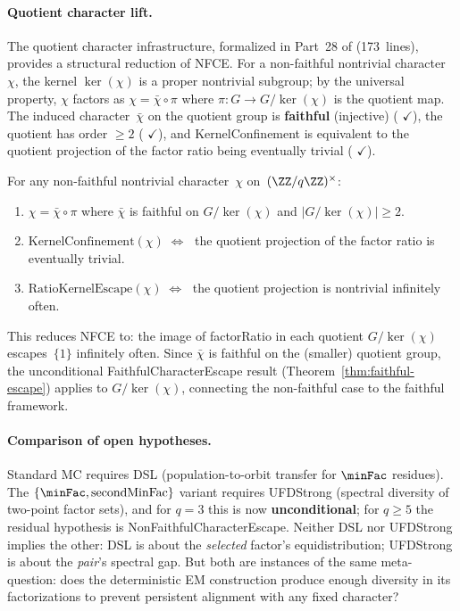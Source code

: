\paragraph{Quotient character lift.}
The quotient character infrastructure, formalized in Part~28 of
 (173~lines),
provides a structural reduction of NFCE\@.
For a non-faithful nontrivial character~$\chi$, the kernel
$\ker(\chi)$ is a proper nontrivial subgroup; by the universal
property, $\chi$ factors as
$\chi = \bar\chi \circ \pi$
where $\pi \colon G \to G/\ker(\chi)$ is the quotient map.
The induced character~$\bar\chi$ on the quotient group is
\textbf{faithful} (injective)
(
{\color{leanink}$\checkmark$}),
the quotient has order $\geq 2$
(
{\color{leanink}$\checkmark$}),
and KernelConfinement is equivalent to the quotient projection
of the factor ratio being eventually trivial
(
{\color{leanink}$\checkmark$}).
\begin{theorem}
\label{thm:quotient-lift}
For any non-faithful nontrivial character~$\chi$ on~$(\ZZ/q\ZZ)^\times$:
\begin{enumerate}[nosep]
\item $\chi = \bar\chi \circ \pi$ where $\bar\chi$ is faithful
  on $G/\ker(\chi)$ and $|G/\ker(\chi)| \geq 2$.
\item $\mathrm{KernelConfinement}(\chi) \;\Longleftrightarrow\;$
  the quotient projection of the factor ratio is eventually trivial.
\item $\mathrm{RatioKernelEscape}(\chi) \;\Longleftrightarrow\;$
  the quotient projection is nontrivial infinitely often.
\end{enumerate}
\end{theorem}

\noindent This reduces NFCE to: the image of factorRatio in each quotient
$G/\ker(\chi)$ escapes~$\{1\}$ infinitely often.
Since $\bar\chi$ is faithful on the (smaller) quotient group, the
unconditional FaithfulCharacterEscape result
(Theorem~\ref{thm:faithful-escape}) applies to $G/\ker(\chi)$,
connecting the non-faithful case to the faithful framework.

\paragraph{Comparison of open hypotheses.}
Standard MC requires DSL (population-to-orbit transfer for $\minFac$
residues).  The $\{\minFac, \operatorname{secondMinFac}\}$ variant
requires UFDStrong (spectral diversity of two-point factor sets), and
for $q = 3$ this is now \textbf{unconditional}; for $q \geq 5$ the
residual hypothesis is NonFaithfulCharacterEscape.
Neither DSL nor UFDStrong implies the other: DSL is about the
\emph{selected} factor's equidistribution; UFDStrong is about the
\emph{pair}'s spectral gap.
But both are instances of the same meta-question: does the deterministic
EM construction produce enough diversity in its factorizations to
prevent persistent alignment with any fixed character?

